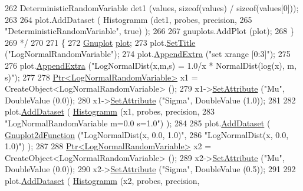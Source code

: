 \begin{DoxyCode}
262 \textcolor{comment}{    DeterministicRandomVariable det1 (values, sizeof(values) / sizeof(values[0]));}
263 \textcolor{comment}{}
264 \textcolor{comment}{    plot.AddDataset ( Histogramm (det1, probes, precision,}
265 \textcolor{comment}{                                  "DeterministicRandomVariable", true) );}
266 \textcolor{comment}{}
267 \textcolor{comment}{    gnuplots.AddPlot (plot);}
268 \textcolor{comment}{  \}}
269 \textcolor{comment}{  */}
270 
271   \{
272     \hyperlink{classns3_1_1Gnuplot}{Gnuplot} \hyperlink{lte__amc_8m_a5942306abe9f005572e4344e3cdef528}{plot};
273     plot.\hyperlink{classns3_1_1Gnuplot_ac01f15633d49f0239f8a45293a1e04f0}{SetTitle} (\textcolor{stringliteral}{"LogNormalRandomVariable"});
274     plot.\hyperlink{classns3_1_1Gnuplot_a649a3041b9d0ea21a212b5ad9b28ecbf}{AppendExtra} (\textcolor{stringliteral}{"set xrange [0:3]"});
275 
276     plot.\hyperlink{classns3_1_1Gnuplot_a649a3041b9d0ea21a212b5ad9b28ecbf}{AppendExtra} (\textcolor{stringliteral}{"LogNormalDist(x,m,s) = 1.0/x * NormalDist(log(x), m, s)"});
277 
278     \hyperlink{classns3_1_1Ptr}{Ptr<LogNormalRandomVariable>} x1 = CreateObject<LogNormalRandomVariable> ();
279     x1->\hyperlink{classns3_1_1ObjectBase_ac60245d3ea4123bbc9b1d391f1f6592f}{SetAttribute} (\textcolor{stringliteral}{"Mu"}, DoubleValue (0.0));
280     x1->\hyperlink{classns3_1_1ObjectBase_ac60245d3ea4123bbc9b1d391f1f6592f}{SetAttribute} (\textcolor{stringliteral}{"Sigma"}, DoubleValue (1.0));
281 
282     plot.\hyperlink{classns3_1_1Gnuplot_a306ec724a327cf9ab699700f31fca0a1}{AddDataset} ( \hyperlink{main-random-variable-stream_8cc_a2cfd3837ab3f2e816cf53486d7a186b5}{Histogramm} (x1, probes, precision,
283                                   \textcolor{stringliteral}{"LogNormalRandomVariable m=0.0 s=1.0"}) );
284 
285     plot.\hyperlink{classns3_1_1Gnuplot_a306ec724a327cf9ab699700f31fca0a1}{AddDataset} ( \hyperlink{classns3_1_1Gnuplot2dFunction}{Gnuplot2dFunction} (\textcolor{stringliteral}{"LogNormalDist(x, 0.0, 1.0)"},
286                                          \textcolor{stringliteral}{"LogNormalDist(x, 0.0, 1.0)"}) );
287 
288     \hyperlink{classns3_1_1Ptr}{Ptr<LogNormalRandomVariable>} x2 = CreateObject<LogNormalRandomVariable> ();
289     x2->\hyperlink{classns3_1_1ObjectBase_ac60245d3ea4123bbc9b1d391f1f6592f}{SetAttribute} (\textcolor{stringliteral}{"Mu"}, DoubleValue (0.0));
290     x2->\hyperlink{classns3_1_1ObjectBase_ac60245d3ea4123bbc9b1d391f1f6592f}{SetAttribute} (\textcolor{stringliteral}{"Sigma"}, DoubleValue (0.5));
291 
292     plot.\hyperlink{classns3_1_1Gnuplot_a306ec724a327cf9ab699700f31fca0a1}{AddDataset} ( \hyperlink{main-random-variable-stream_8cc_a2cfd3837ab3f2e816cf53486d7a186b5}{Histogramm} (x2, probes, precision,

\end{DoxyCode}
